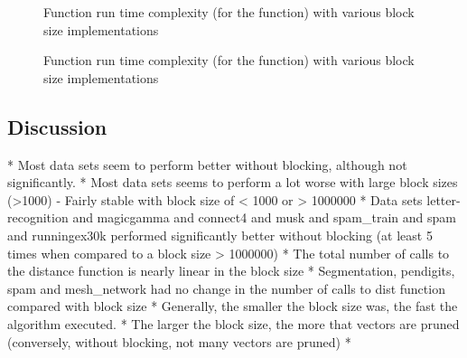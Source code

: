 \begin{figure}
    \centering
    \begin{minipage}{\textwidth}
        \centering
        
        \caption[Function run time complexity with various block size
            implementations (linear)]{Function run time complexity (for the
             function) with various block
            size implementations}
        \label{profiling:blockSize:functionRunTimeComplexity:linear}
    \end{minipage}
    \begin{minipage}{\textwidth}
       \centering
        
        \caption[Function run time complexity with various block size
            implementations (logarithmic)]{Function run time complexity (for the
             function) with various block
            size implementations}
        \label{profiling:blockSize:functionRunTimeComplexity:logarithmic}
    \end{minipage}
\end{figure}

\subsection{Discussion}
\label{algorithmPerformance:discussion}
* Most data sets seem to perform better without blocking, although not significantly.
* Most data sets seems to perform a lot worse with large block sizes (>1000)
    - Fairly stable with block size of < 1000 or > 1000000
* Data sets letter-recognition and magicgamma and connect4 and musk and spam_train and spam and runningex30k performed significantly better without blocking (at least 5 times when compared to a block size > 1000000)
* The total number of calls to the distance function is nearly linear in the block size
* Segmentation, pendigits, spam and mesh_network had no change in the number of calls to dist function compared with block size
* Generally, the smaller the block size was, the fast the algorithm executed.
* The larger the block size, the more that vectors are pruned (conversely, without blocking, not many vectors are pruned)
*